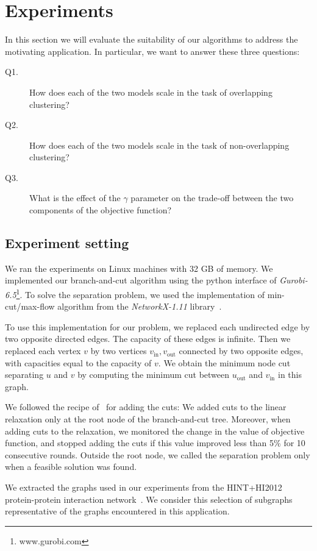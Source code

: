 \documentclass[conference,compsoc]{IEEEtran}
\begin{document}
\section{Experiments}
\label{sec:experiments}

In this section we will evaluate the suitability of our algorithms to address the motivating application. In particular, we want to answer these three questions:

\begin{description}
\item[Q1.] How does each of the two models scale in the task of overlapping clustering?
\item[Q2.] How does each of the two models scale in the task of non-overlapping clustering?
\item[Q3.] What is the effect of the $\gamma$ parameter on the trade-off between the two components of the objective function?
\end{description}


\subsection{Experiment setting}
We ran the experiments on Linux machines with 32 GB of memory. We implemented our branch-and-cut algorithm using the python interface
of \emph{Gurobi-6.5}\footnote{www.gurobi.com}. To solve the separation problem, we used the implementation of min-cut/max-flow algorithm from the \emph{NetworkX-1.11} library~\cite{NetworkX}. 

To use this implementation for our problem, we replaced
each undirected edge by two opposite directed edges. The capacity of
these edges is infinite. Then we replaced each vertex $v$ by two
vertices $v_{\text{in}}, v_{\text{out}}$ connected by two opposite
edges, with capacities equal to the capacity of $v$. We obtain the
minimum node cut separating $u$ and $v$ by computing the minimum cut
between $u_{\text{out}}$ and $v_{\text{in}}$ in this graph.

We followed the recipe of~\cite{CarvajalCGVW13} for adding the cuts: We added cuts to the
linear relaxation only at the root node of the branch-and-cut tree.
Moreover, when adding cuts to the relaxation, we monitored the change in
the value of objective function, and stopped adding the cuts if this
value improved less than 5\% for 10 consecutive rounds. Outside the root
node, we called the separation problem only when a feasible solution was
found.

We extracted the graphs used in our experiments from the HINT+HI2012 protein-protein interaction network~\cite{das2012hint,yu2011next}. We consider this selection of subgraphs representative of the graphs encountered in this application.
\end{document}
